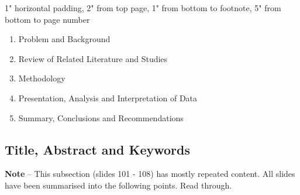 \documentclass{article}
\begin{document}
1" horizontal padding, 2" from top page, 1" from bottom to footnote, 5" from bottom to page number

\begin{enumerate}
    \item Problem and Background
    \item Review of Related Literature and Studies
    \item Methodology
    \item Presentation, Analysis and Interpretation of Data
    \item Summary, Conclusions and Recommendations
\end{enumerate}

\subsection{Title, Abstract and Keywords}

\textbf{Note} --  This subsection (slides 101 - 108) has mostly repeated content. All slides have been summarised into the following points. Read through.
\end{document}
